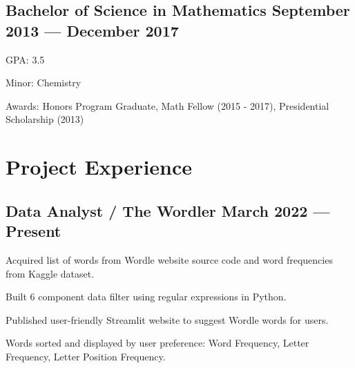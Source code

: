 \documentclass[letter,10pt]{article}
\begin{document}
\subsection{{Bachelor of Science in Mathematics \hfill September 2013 --- December 2017}}
\begin{zitemize}
    \item GPA: 3.5
    \item Minor: Chemistry
    \item Awards: Honors Program Graduate, Math Fellow (2015 - 2017), Presidential Scholarship (2013)
\end{zitemize}

\section{Project Experience}
\subsection{{Data Analyst / The Wordler \hfill March 2022 --- Present}}
\begin{zitemize}
    \item Acquired list of words from Wordle website source code and word frequencies from Kaggle dataset.
    \item Built 6 component data filter using regular expressions in Python.
    \item Published user-friendly Streamlit website to suggest Wordle words for users.
    \item Words sorted and displayed by user preference: Word Frequency, Letter Frequency, Letter Position Frequency.
\end{zitemize}
\end{document}
